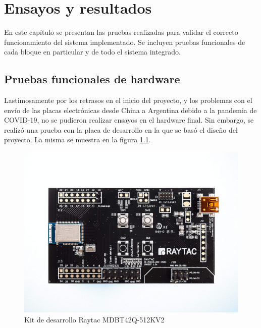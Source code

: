 
\chapter{Ensayos y resultados} %

\label{Chapter4} %

En este capítulo se presentan las pruebas realizadas para validar el correcto funcionamiento del sistema implementado. Se incluyen pruebas funcionales de cada bloque en particular y de todo el sistema integrado.


\section{Pruebas funcionales de hardware}
\label{sec:pruebasHW}

Lastimosamente por los retrasos en el inicio  del proyecto, y los problemas con el envío de las placas electrónicas desde China a Argentina debido a la pandemia de COVID-19, no se pudieron realizar ensayos en el hardware final. Sin embargo, se realizó una prueba con la placa de desarrollo en la que se basó el diseño del proyecto. La misma se muestra en la figura \ref{fig:KDRaytac}.

\begin{figure}[htpb]
	\centering
	\includegraphics[scale=0.15]{./Figures/DKMDBT42Q-512KV2.jpg}
	\caption{Kit de desarrollo Raytac MDBT42Q-512KV2}
	\label{fig:KDRaytac}
\end{figure}

